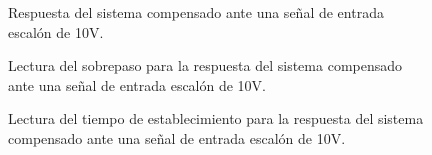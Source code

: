 \documentclass[a4paper,11pt]{article}
\begin{document}
	  \begin{figure}[H] %
	\caption{Respuesta del sistema compensado ante una señal de entrada escalón de 10V.}
	\label{fig:FTlazoc_comp_step}
	\end{figure} 

 \begin{figure}[H] %
	\caption{Lectura del sobrepaso para la respuesta del sistema compensado ante una señal de entrada escalón de 10V.}
	\label{fig:FTlazoc_comp_step+sobrepaso}
\end{figure} 

 \begin{figure}[H] %
	\caption{Lectura del tiempo de establecimiento para la respuesta del sistema compensado ante una señal de entrada escalón de 10V.}
	\label{fig:FTlazoc_comp_step+ts}
\end{figure} 
\end{document}
